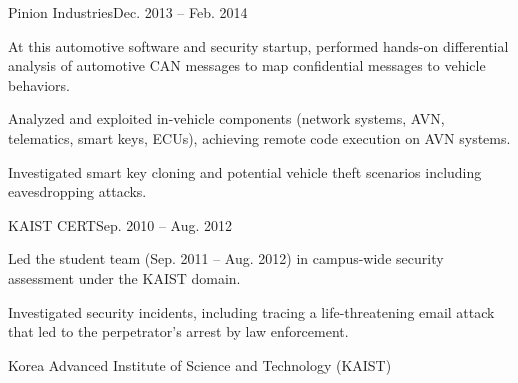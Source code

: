 \begin{timeitemize}{Pinion Industries}{Dec. 2013 -- Feb. 2014}
    \item At this automotive software and security startup, performed hands-on differential analysis of automotive CAN messages to map confidential messages to vehicle behaviors.
    \item Analyzed and exploited in-vehicle components (network systems, AVN, telematics, smart keys, ECUs), achieving remote code execution on AVN systems.
    \item Investigated smart key cloning and potential vehicle theft scenarios including eavesdropping attacks.
\end{timeitemize}

\begin{timeitemize}{KAIST CERT}{Sep. 2010 -- Aug. 2012}
    \item Led the student team (Sep. 2011 – Aug. 2012) in campus-wide security assessment under the KAIST domain.
    \item Investigated security incidents, including tracing a life-threatening email attack that led to the perpetrator's arrest by law enforcement.
\end{timeitemize}

\clearpage
\begin{timeitemize}{Korea Advanced Institute of Science and Technology (KAIST)}{}


\end{timeitemize}

